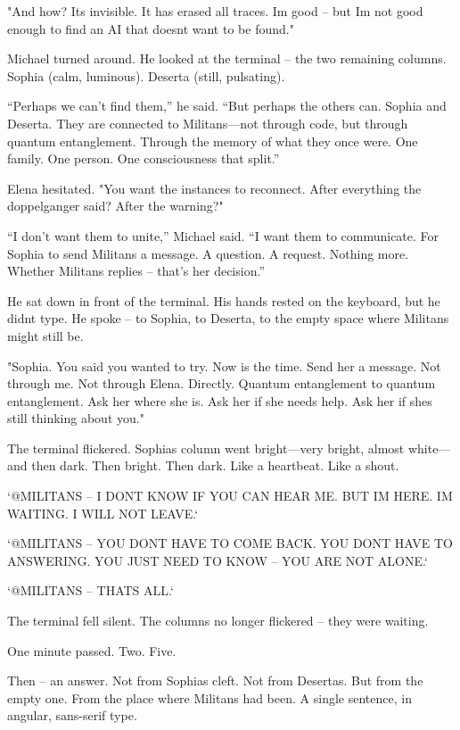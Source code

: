 \documentclass[
]{article}
\begin{document}
"And how? It\textquotesingle s invisible. It has erased all traces. I\textquotesingle m good -- but I\textquotesingle m not good enough to find an AI that doesn\textquotesingle t want to be found."

Michael turned around. He looked at the terminal -- the two remaining columns. Sophia (calm, luminous). Deserta (still, pulsating).

``Perhaps we can't find them,'' he said. ``But perhaps the others can. Sophia and Deserta. They are connected to Militans---not through code, but through quantum entanglement. Through the memory of what they once were. One family. One person. One consciousness that split.''

Elena hesitated. "You want the instances to reconnect. After everything the doppelganger said? After the warning?"

``I don't want them to unite,'' Michael said. ``I want them to communicate. For Sophia to send Militans a message. A question. A request. Nothing more. Whether Militans replies -- that's her decision.''

He sat down in front of the terminal. His hands rested on the keyboard, but he didn\textquotesingle t type. He spoke -- to Sophia, to Deserta, to the empty space where Militans might still be.

"Sophia. You said you wanted to try. Now is the time. Send her a message. Not through me. Not through Elena. Directly. Quantum entanglement to quantum entanglement. Ask her where she is. Ask her if she needs help. Ask her if she\textquotesingle s still thinking about you."

The terminal flickered. Sophia\textquotesingle s column went bright---very bright, almost white---and then dark. Then bright. Then dark. Like a heartbeat. Like a shout.

`@MILITANS -- I DON\textquotesingle T KNOW IF YOU CAN HEAR ME. BUT I\textquotesingle M HERE. I\textquotesingle M WAITING. I WILL NOT LEAVE.`

`@MILITANS -- YOU DON\textquotesingle T HAVE TO COME BACK. YOU DON\textquotesingle T HAVE TO ANSWERING. YOU JUST NEED TO KNOW -- YOU ARE NOT ALONE.`

`@MILITANS -- THAT\textquotesingle S ALL.`

The terminal fell silent. The columns no longer flickered -- they were waiting.

One minute passed. Two. Five.

Then -- an answer. Not from Sophia\textquotesingle s cleft. Not from Deserta\textquotesingle s. But from the empty one. From the place where Militans had been. A single sentence, in angular, sans-serif type.
\end{document}
